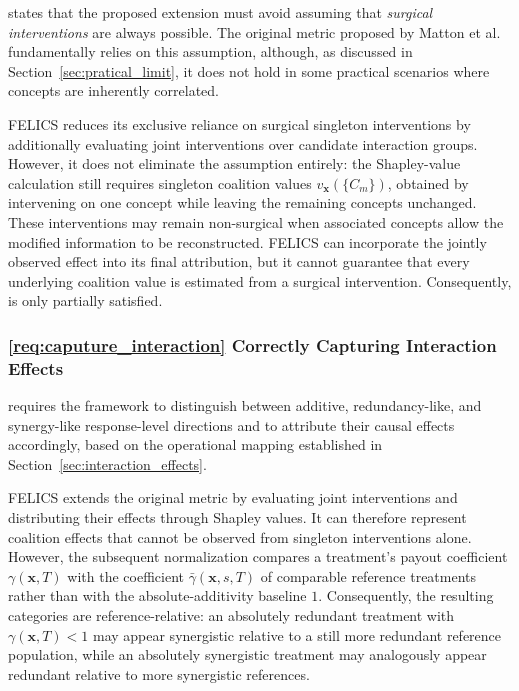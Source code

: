  states that the proposed extension must avoid assuming that \emph{surgical interventions} are always possible. The original metric proposed by Matton et al.~\cite{mattonWalkTalkMeasuring2024} fundamentally relies on this assumption, although, as discussed in Section~\ref{sec:pratical_limit}, it does not hold in some practical scenarios where concepts are inherently correlated.

FELICS reduces its exclusive reliance on surgical singleton interventions by additionally evaluating joint interventions over candidate interaction groups. However, it does not eliminate the assumption entirely: the Shapley-value calculation still requires singleton coalition values $v_{\mathbf{x}}(\{C_m\})$, obtained by intervening on one concept while leaving the remaining concepts unchanged. These interventions may remain non-surgical when associated concepts allow the modified information to be reconstructed. FELICS can incorporate the jointly observed effect into its final attribution, but it cannot guarantee that every underlying coalition value is estimated from a surgical intervention. Consequently,  is only partially satisfied.

\subsubsection{\ref{req:caputure_interaction} Correctly Capturing Interaction Effects}

 requires the framework to distinguish between additive, redundancy-like, and synergy-like response-level directions and to attribute their causal effects accordingly, based on the operational mapping established in Section~\ref{sec:interaction_effects}.

FELICS extends the original metric by evaluating joint interventions and distributing their effects through Shapley values. It can therefore represent coalition effects that cannot be observed from singleton interventions alone. However, the subsequent normalization compares a treatment's payout coefficient $\gamma(\mathbf{x},T)$ with the coefficient $\bar\gamma(\mathbf{x},s,T)$ of comparable reference treatments rather than with the absolute-additivity baseline $1$. Consequently, the resulting categories are reference-relative: an absolutely redundant treatment with $\gamma(\mathbf{x},T)<1$ may appear synergistic relative to a still more redundant reference population, while an absolutely synergistic treatment may analogously appear redundant relative to more synergistic references.


